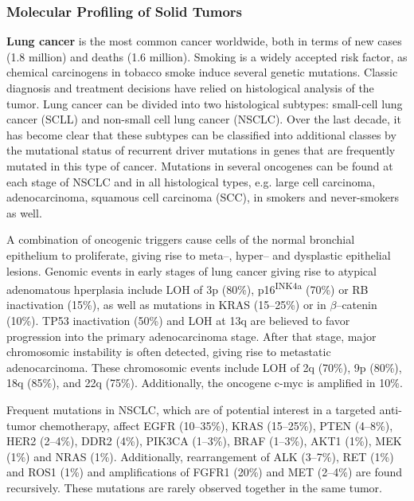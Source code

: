 {{{    \subsubsection{Molecular Profiling of Solid Tumors}

    \textbf{Lung cancer} is the most common cancer worldwide, both in terms of
    new cases (1.8 million) and deaths (1.6 million). Smoking is a widely
    accepted risk factor, as chemical carcinogens in tobacco smoke induce
    several genetic mutations. Classic diagnosis and treatment decisions have
    relied on histological analysis of the tumor. Lung cancer can be divided
    into two histological subtypes: small-cell lung cancer (SCLL) and non-small
    cell lung cancer (NSCLC). Over the last decade, it has become clear that
    these subtypes can be classified into  additional classes by the mutational
    status of recurrent driver mutations in genes that are frequently mutated in
    this type of cancer. Mutations in several oncogenes can be found at each
    stage of NSCLC and in all histological types, e.g. large cell carcinoma,
    adenocarcinoma, squamous cell  carcinoma (SCC), in smokers and never-smokers
    as well.

    A combination of oncogenic triggers cause cells of the normal bronchial
    epithelium to proliferate, giving rise to meta--, hyper-- and dysplastic
    epithelial lesions. Genomic events in early stages of lung cancer giving
    rise to atypical adenomatous hperplasia include LOH of 3p (80\%),
    p16\textsuperscript{INK4a} (70\%) or RB inactivation (15\%), as well as
    mutations in KRAS (15--25\%) or in $\beta$--catenin (10\%). TP53
    inactivation (50\%) and LOH at 13q are believed to favor progression into
    the primary adenocarcinoma stage. After that stage, major chromosomic
    instability is often detected, giving rise to metastatic adenocarcinoma.
    These chromosomic events include LOH of 2q (70\%), 9p (80\%), 18q (85\%),
    and 22q (75\%). Additionally, the oncogene c-myc is amplified in 10\%.

    Frequent  mutations in NSCLC, which are of potential interest in a targeted
    anti-tumor chemotherapy, affect EGFR (10--35\%), KRAS (15--25\%), PTEN
    (4--8\%), HER2 (2--4\%), DDR2 (4\%), PIK3CA (1--3\%), BRAF (1--3\%), AKT1
    (1\%), MEK (1\%) and NRAS (1\%). Additionally, rearrangement of ALK
    (3--7\%), RET (1\%) and ROS1 (1\%) and amplifications of FGFR1 (20\%) and
    MET (2--4\%) are found recursively. These mutations are rarely observed
    together in the same tumor.

}}}

